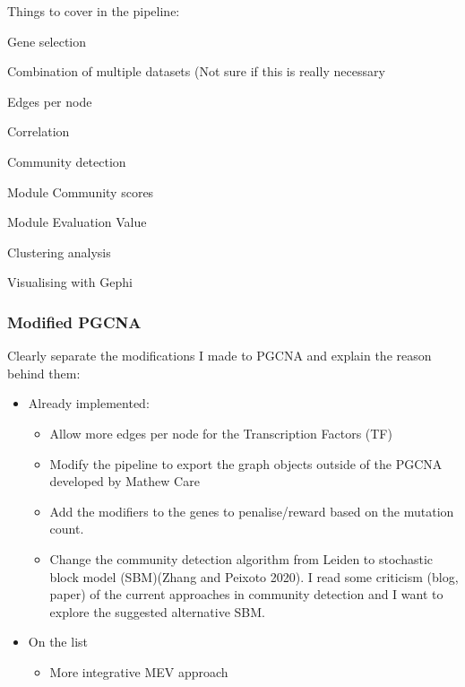 \newpage
Things to cover in the pipeline:
\begin{todolist}
    \item Gene selection
    \item Combination of multiple datasets (Not sure if this is really necessary
    \item [\done] Edges per node
    \item [\done] Correlation
    \item [\done] Community detection
    \item [\done] Module Community scores
    \item [\done] Module Evaluation Value
    \item Clustering analysis
    \item Visualising with Gephi
\end{todolist}

\subsubsection{Modified PGCNA}

Clearly separate the modifications I made to PGCNA and explain the reason behind them:

\begin{itemize}
    \item Already implemented:
          \begin{itemize}
              \item Allow more edges per node for the Transcription Factors (TF)
              \item Modify the pipeline to export the graph objects outside of the PGCNA developed by Mathew Care
              \item Add the modifiers to the genes to penalise/reward based on the mutation count.
              \item Change the community detection algorithm from Leiden to stochastic block model (SBM)(Zhang and Peixoto 2020). I read some criticism (blog, paper) of the current approaches in community detection and I want to explore the suggested alternative SBM.
          \end{itemize}
    \item On the list
    \begin{itemize}
        \item More integrative MEV approach
    \end{itemize}
\end{itemize}

